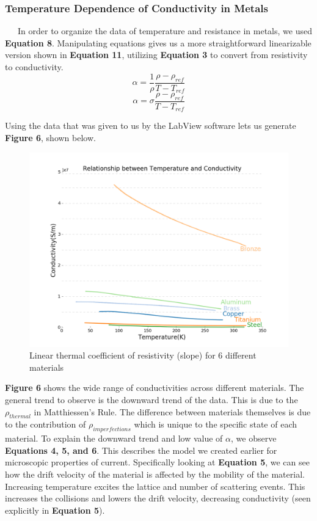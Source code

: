\documentclass[11pt]{article}
\begin{document}
\subsubsection*{Temperature Dependence of Conductivity in Metals}
\ \ \ In order to organize the data of temperature and resistance in metals, we used \textbf{Equation 8}. Manipulating equations gives us a more straightforward linearizable version shown in \textbf{Equation 11}, utilizing \textbf{Equation 3} to convert from resistivity to conductivity.
$$\alpha = \frac{1}{\rho}\frac{\rho - \rho_{ref}}{T-T_{ref}}$$
\begin{equation}
\alpha = \sigma\frac{\rho - \rho_{ref}}{T-T_{ref}}
\end{equation}

Using the data that was given to us by the LabView software lets us generate \textbf{Figure 6}, shown below.

\begin{figure}[h]
	\centering
	\includegraphics[scale=0.35]{lab1b.png}
	\caption{Linear thermal coefficient of resistivity (slope) for 6 different materials}
\end{figure}

\textbf{Figure 6} shows the wide range of conductivities across different materials. The general trend to observe is the downward trend of the data. This is due to the $\rho_{thermal}$ in Matthiessen's Rule. The difference between materials themselves is due to the contribution of $\rho_{imperfections}$ which is unique to the specific state of each material. To explain the downward trend and low value of $\alpha$, we observe \textbf{Equations 4, 5, and 6}. This describes the model we created earlier for microscopic properties of current. Specifically looking at \textbf{Equation 5}, we can see how the drift velocity of the material is affected by the mobility of the material. Increasing temperature excites the lattice and number of scattering events. This increases the collisions and lowers the drift velocity, decreasing conductivity (seen explicitly in \textbf{Equation 5}).\\
\end{document}
